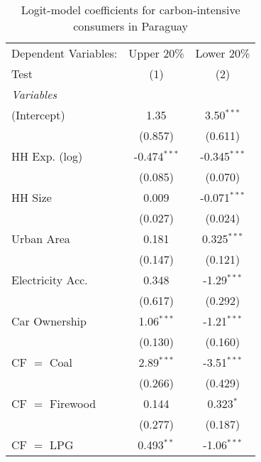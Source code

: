 
\begin{table}[htbp!]
   \centering
   \small
   \begin{adjustbox}{width = 1\textwidth, max height = 0.95\textheight, center}
      \begin{threeparttable}[b]
         \caption{\label{tab:Logit_1_PRY} Logit-model coefficients for carbon-intensive consumers in Paraguay}
         \begin{tabular}{lcc}
            \tabularnewline \midrule \midrule
            Dependent Variables: & Upper 20\%     & Lower 20\%\\   
            Test                 & (1)            & (2)\\  
            \midrule
            \emph{Variables}\\
            (Intercept)          & 1.35           & 3.50$^{***}$\\   
                                 & (0.857)        & (0.611)\\   
            HH Exp. (log)        & -0.474$^{***}$ & -0.345$^{***}$\\   
                                 & (0.085)        & (0.070)\\   
            HH Size              & 0.009          & -0.071$^{***}$\\   
                                 & (0.027)        & (0.024)\\   
            Urban Area           & 0.181          & 0.325$^{***}$\\   
                                 & (0.147)        & (0.121)\\   
            Electricity Acc.     & 0.348          & -1.29$^{***}$\\   
                                 & (0.617)        & (0.292)\\   
            Car Ownership        & 1.06$^{***}$   & -1.21$^{***}$\\   
                                 & (0.130)        & (0.160)\\   
            CF $=$ Coal          & 2.89$^{***}$   & -3.51$^{***}$\\   
                                 & (0.266)        & (0.429)\\   
            CF $=$ Firewood      & 0.144          & 0.323$^{*}$\\   
                                 & (0.277)        & (0.187)\\   
            CF $=$ LPG           & 0.493$^{**}$   & -1.06$^{***}$\\   

\end{tabular}
\end{threeparttable}
\end{adjustbox}
\end{table}
